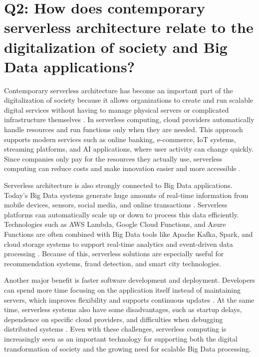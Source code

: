 \section{Q2: How does contemporary serverless architecture relate to the digitalization of 
society and Big Data applications?}


Contemporary serverless architecture has become an important part of the digitalization of society because it allows organizations to create and run scalable digital services without having to manage physical servers or complicated infrastructure themselves \cite{baldini2017}. In serverless computing, cloud providers automatically handle resources and run functions only when they are needed. This approach supports modern services such as online banking, e-commerce, IoT systems, streaming platforms, and AI applications, where user activity can change quickly. Since companies only pay for the resources they actually use, serverless computing can reduce costs and make innovation easier and more accessible \cite{baldini2017,jonas2019}.

Serverless architecture is also strongly connected to Big Data applications. Today’s Big Data systems generate huge amounts of real-time information from mobile devices, sensors, social media, and online transactions \cite{chen2014}. Serverless platforms can automatically scale up or down to process this data efficiently. Technologies such as AWS Lambda, Google Cloud Functions, and Azure Functions are often combined with Big Data tools like Apache Kafka, Spark, and cloud storage systems to support real-time analytics and event-driven data processing \cite{baldini2017,jonas2019}. Because of this, serverless solutions are especially useful for recommendation systems, fraud detection, and smart city technologies.

Another major benefit is faster software development and deployment. Developers can spend more time focusing on the application itself instead of maintaining servers, which improves flexibility and supports continuous updates \cite{jonas2019}. At the same time, serverless systems also have some disadvantages, such as startup delays, dependence on specific cloud providers, and difficulties when debugging distributed systems \cite{baldini2017}. Even with these challenges, serverless computing is increasingly seen as an important technology for supporting both the digital transformation of society and the growing need for scalable Big Data processing.